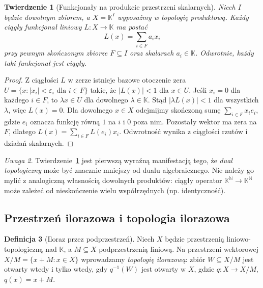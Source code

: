 \documentclass[11pt,a4paper]{article}
\numberwithin{equation}{section}
\theoremstyle{plain}
\newtheorem{twierdzenie}{Twierdzenie}[section]
\theoremstyle{definition}
\newtheorem{definicja}[twierdzenie]{Definicja}
\theoremstyle{remark}
\newtheorem{uwaga}[twierdzenie]{Uwaga}
\newcommand{\N}{\mathbb N}
\newcommand{\K}{\mathbb K}
\begin{document}
\begin{twierdzenie}[Funkcjonały na produkcie przestrzeni skalarnych]\label{thm:product-dual}
Niech $I$ będzie dowolnym zbiorem, a $X=\K^I$ wyposażmy
w topologię produktową. Każdy ciągły funkcjonał liniowy
$L:X\to\K$ ma postać
\[
 L(x)=\sum_{i\in F}a_i x_i
\]
przy pewnym skończonym zbiorze $F\subseteq I$ oraz
skalarach $a_i\in\K$. Odwrotnie, każdy taki funkcjonał
jest ciągły.
\end{twierdzenie}
\begin{proof}
Z ciągłości $L$ w zerze istnieje bazowe otoczenie zera
$U=\{x:|x_i|<\varepsilon_i\text{ dla }i\in F\}$
takie, że $|L(x)|<1$ dla $x\in U$.
Jeśli $x_i=0$ dla każdego $i\in F$, to $\lambda x\in U$
dla dowolnego $\lambda\in\K$. Stąd
$|\lambda L(x)|<1$ dla wszystkich $\lambda$, więc $L(x)=0$.
Dla dowolnego $x\in X$ odejmijmy skończoną sumę
$\sum_{i\in F}x_i e_i$, gdzie $e_i$ oznacza funkcję
równą $1$ na $i$ i $0$ poza nim. Pozostały wektor
ma zera na $F$, dlatego $L(x)=\sum_{i\in F}L(e_i)x_i$.
Odwrotność wynika z ciągłości rzutów i działań skalarnych.
\end{proof}

\begin{uwaga}
Twierdzenie~\ref{thm:product-dual} jest pierwszą wyraźną
manifestacją tego, że \emph{dual topologiczny} może być
znacznie mniejszy od dualu algebraicznego. Nie należy go
mylić z analogiczną własnością dowolnych produktów:
ciągły operator $\K^{\N}\to\K^{\N}$ może zależeć
od nieskończenie wielu współrzędnych (np. identyczność).
\end{uwaga}

\subsection{Przestrzeń ilorazowa i topologia ilorazowa}

\begin{definicja}[Iloraz przez podprzestrzeń]
Niech $X$ będzie przestrzenią liniowo-topologiczną nad $\K$,
a $M\subseteq X$ podprzestrzenią liniową. Na przestrzeni
wektorowej $X/M=\{x+M:x\in X\}$ wprowadzamy
\emph{topologię ilorazową}: zbiór $W\subseteq X/M$
jest otwarty wtedy i tylko wtedy, gdy $q^{-1}(W)$
jest otwarty w $X$, gdzie $q:X\to X/M$, $q(x)=x+M$.
\end{definicja}
\end{document}
